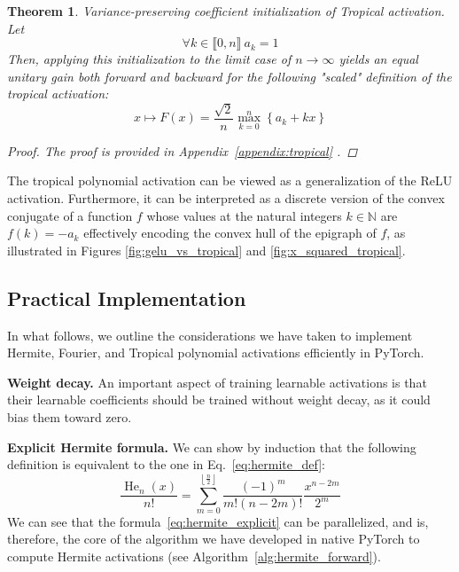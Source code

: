 \documentclass{article} %
\theoremstyle{plain}
\newtheorem{theorem}{Theorem}[section]
\theoremstyle{definition}
\theoremstyle{remark}
\begin{document}
\begin{theorem}
\label{thm:tropical}
Variance-preserving coefficient initialization of Tropical activation. Let 
\begin{equation}
     \forall k \in \llbracket 0,n \rrbracket \ a_k = 1 
\end{equation}
Then, applying this initialization to the limit case of $n\to\infty$ yields an equal unitary gain both forward and backward for the following "scaled" definition of the tropical activation:
\begin{equation}
x \mapsto  F(x) = \frac{\sqrt{2}}{n} \max_{k=0}^{n} \left\{ a_k + kx \right\}
\end{equation}
\begin{proof}
    The proof is provided in Appendix~\ref{appendix:tropical}  .
\end{proof}
\end{theorem}
The tropical polynomial activation can be viewed as a generalization of the ReLU activation. Furthermore, it can be interpreted as a discrete version of the convex conjugate of a function $f$ whose values at the natural integers $k \in \mathbb{N}$ are $f(k) = -a_k$ effectively encoding the convex hull of the epigraph of $f$, as illustrated in Figures \ref{fig:gelu_vs_tropical} and \ref{fig:x_squared_tropical}.

\subsection{Practical Implementation}
In what follows, we outline the considerations we have taken to implement Hermite, Fourier, and Tropical polynomial activations efficiently in PyTorch.

\textbf{Weight decay.} An important aspect of training learnable activations is that their learnable coefficients should be trained without weight decay, as it could bias them toward zero. 

\textbf{Explicit Hermite formula.} We can show by induction that the following definition is equivalent to the one in Eq.~\ref{eq:hermite_def}:
\begin{equation}
\label{eq:hermite_explicit}
    \frac{\operatorname{He}_n(x)}{n!}=\sum_{m=0}^{\left\lfloor\frac{n}{2}\right\rfloor} \frac{(-1)^m}{m!(n-2 m)!} \frac{x^{n-2 m}}{2^m}
\end{equation}
We can see that the formula~\ref{eq:hermite_explicit} can be parallelized, and is, therefore, the core of the algorithm we have developed in native PyTorch to compute Hermite activations (see Algorithm~\ref{alg:hermite_forward}).
\end{document}
